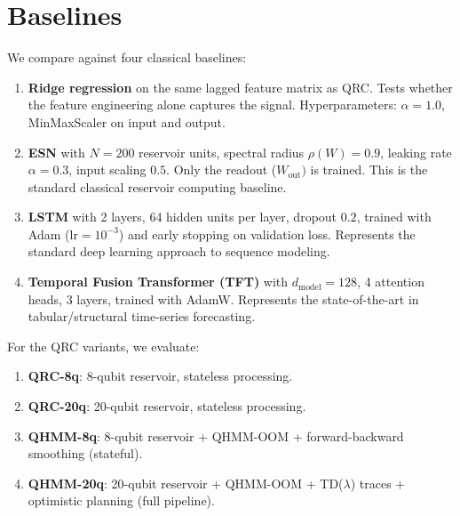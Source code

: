 \section{Baselines}
\label{sec:baselines}


We compare against four classical baselines:


\begin{enumerate}
  \item \textbf{Ridge regression} on the same lagged feature matrix as QRC.
    Tests whether the feature engineering alone captures the signal.
    Hyperparameters: $\alpha=1.0$, MinMaxScaler on input and output.


  \item \textbf{ESN} \citep{jaeger2004harnessing} with $N=200$ reservoir
    units, spectral radius $\rho(W)=0.9$, leaking rate $\alpha=0.3$,
    input scaling $0.5$. Only the readout ($W_{\mathrm{out}})$ is trained.
    This is the standard classical reservoir computing baseline.


  \item \textbf{LSTM} \citep{hochreiter1997lstm} with 2 layers,
    64 hidden units per layer, dropout $0.2$, trained with Adam
    ($\mathrm{lr}=10^{-3}$) and early stopping on validation loss.
    Represents the standard deep learning approach to sequence modeling.


  \item \textbf{Temporal Fusion Transformer (TFT)} \citep{lim2019tft} with
    $d_{\mathrm{model}}=128$, 4 attention heads, 3 layers,
    trained with AdamW. Represents the state-of-the-art in
    tabular/structural time-series forecasting.

\end{enumerate}

For the QRC variants, we evaluate:

\begin{enumerate}
  \item \textbf{QRC-8q}: 8-qubit reservoir, stateless processing.
  \item \textbf{QRC-20q}: 20-qubit reservoir, stateless processing.
  \item \textbf{QHMM-8q}: 8-qubit reservoir + QHMM-OOM + forward-backward
    smoothing (stateful).
  \item \textbf{QHMM-20q}: 20-qubit reservoir + QHMM-OOM + TD($\lambda$)
    traces + optimistic planning (full pipeline).
\end{enumerate}

